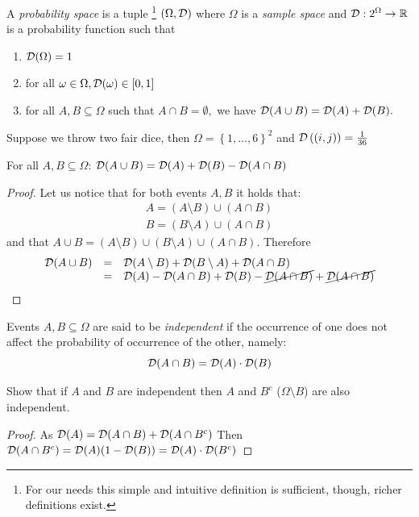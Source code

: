 \begin{definition}
	A \textit{probability space} is a tuple \footnote{For our needs this simple and intuitive definition is sufficient, though, richer definitions exist.} $(\Omega, \mathcal{D})$ where $\Omega$ is a \emph{sample space} and $\mathcal{D}:2^{\Omega}\rightarrow\mathbb{R}$ is a probability function such that
	\begin{enumerate}
		\item $\mathcal{D}(\Omega)=1$
		\item for all $\omega\in\Omega, \mathcal{D}(\omega)\in[0,1]$
		\item for all $A,B\subseteq\Omega$ such that $A\cap B=\emptyset,$ we have $\mathcal{D}(A \cup B)=\mathcal{D}(A)+\mathcal{D}(B).$
	\end{enumerate}
\end{definition}

\begin{example}
	Suppose we throw two fair dice, then $\Omega=\left\{ 1,\dots,6\right\} ^{2}$ and $\mathcal{D}\left(\left(i,j\right)\right)=\frac{1}{36}$
\end{example}


\begin{claim}
	For all $A,B\subseteq\Omega$: $\mathcal{D}(A\cup B)=\mathcal{D}(A)+\mathcal{D}(B)-\mathcal{D}(A\cap B)$
\end{claim}
\begin{proof}
Let us notice that for both events $A,B$ it holds that:
$$
\begin{array}{c}
A=(A\setminus B)\cup(A\cap B)\\
B=(B\setminus A)\cup(A\cap B)
\end{array}
$$
and that $A\cup B=(A\setminus B)\cup(B\setminus A)\cup(A\cap B)$. Therefore
$$\begin{array}{ccl}
\mathcal{D}(A\cup B) & = & \mathcal{D}(A\setminus B)+\mathcal{D}(B\setminus A)+\mathcal{D}(A\cap B)\\
&=&\mathcal{D}(A)-\mathcal{D}(A\cap B)+\mathcal{D}(B) -  \cancel{\mathcal{D}(A\cap B)}  + \cancel{\mathcal{D}(A\cap B)} 
\end{array}$$
\end{proof}

\begin{definition}
Events $A,B\subseteq\Omega$ are said to be \textit{independent} if the occurrence of one does not affect the probability of occurrence of the other, namely: $$\mathcal{D}(A\cap B) =\mathcal{D}(A)\cdot\mathcal{D}(B)$$
\end{definition}

\begin{exercise}
Show that if $A$ and $B$ are independent then $A$ and $B^c$ ($\Omega\setminus B$) are also independent.
\end{exercise}
\begin{proof}
As $\mathcal{D}(A)=\mathcal{D}(A\cap B)+\mathcal{D}(A\cap B^c)$ Then $\mathcal{D}(A\cap B^c)=\mathcal{D}(A)(1-\mathcal{D}(B))=\mathcal{D}(A)\cdot\mathcal{D}(B^c)$
\end{proof}

